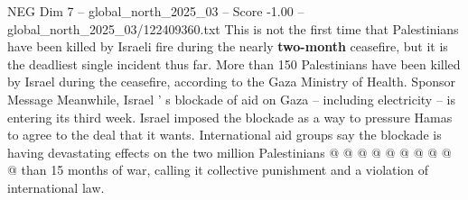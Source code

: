 \begin{textsample}{NEG Dim 7 – global\_north\_2025\_03 – Score -1.00 – global\_north\_2025\_03/122409360.txt}
This is not the first time that Palestinians have been killed by Israeli fire during the nearly \textbf{two-month} ceasefire, but it is the deadliest single incident thus far.
More than 150 Palestinians have been killed by Israel during the ceasefire, according to the Gaza Ministry of Health.
Sponsor Message Meanwhile, Israel ' s blockade of aid on Gaza -- including electricity -- is entering its third week.
Israel imposed the blockade as a way to pressure Hamas to agree to the deal that it wants.
International aid groups say the blockade is having devastating effects on the two million Palestinians @ @ @ @ @ @ @ @ @ @ than 15 months of war, calling it collective punishment and a violation of international law.

\end{textsample}
